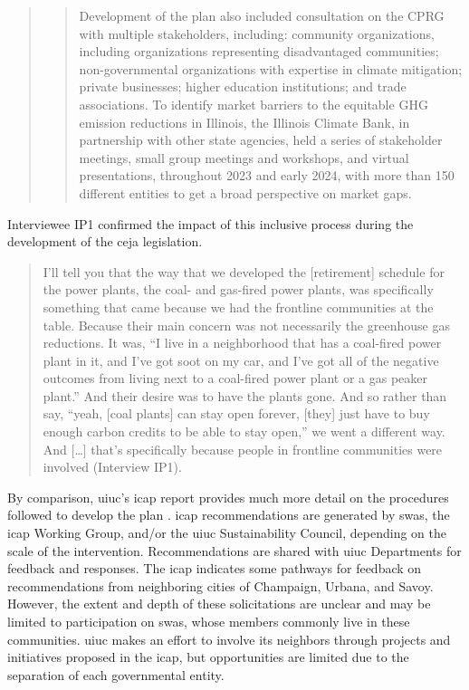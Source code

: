 \begin{quote}
    \blockcquote[10]{kibbey_state_2024}{Development of the plan also included
    consultation on the CPRG with multiple stakeholders, including: community
    organizations, including organizations representing disadvantaged
    communities; non-governmental organizations with expertise in climate
    mitigation; private businesses; higher education institutions; and trade
    associations. To identify market barriers to the equitable GHG emission
    reductions in Illinois, the Illinois Climate Bank, in partnership with other
    state agencies, held a series of stakeholder meetings, small group meetings
    and workshops, and virtual presentations, throughout 2023 and early 2024,
    with more than 150 different entities to get a broad perspective on market
    gaps.}
\end{quote}

Interviewee IP1 confirmed the impact of this inclusive process during the
development of the \ac{ceja} legislation.
\begin{quote}
     I'll tell you that the way that we developed the [retirement] schedule for
     the power plants, the coal- and gas-fired power plants, was specifically
     something that came because we had the frontline communities at the table.
     Because their main concern was not necessarily the greenhouse gas
     reductions. It was, ``I live in a neighborhood that has a coal-fired power
     plant in it, and I've got soot on my car, and I've got all of the negative
     outcomes from living next to a coal-fired power plant or a gas peaker
     plant.'' And their desire was to have the plants gone. And so rather than
     say, ``yeah, [coal plants] can stay open forever, [they] just have to buy
     enough carbon credits to be able to stay open,'' we went a different way.
     And [\dots] that's specifically because people in frontline communities
     were involved (Interview IP1).
\end{quote}

By comparison, \ac{uiuc}'s \acf{icap} report provides much more detail on the
procedures followed to develop the plan
\cite{institute_for_sustainability_energy_and_environment_illinois_2020}.
\ac{icap} recommendations are generated by \acp{swa}, the \ac{icap} Working
Group, and/or the \ac{uiuc} Sustainability Council, depending on the scale of
the intervention. Recommendations are shared with \ac{uiuc} Departments for
feedback and responses. The \ac{icap} indicates some pathways for feedback on
recommendations from neighboring cities of Champaign, Urbana, and Savoy.
However, the extent and depth of these solicitations are unclear and may be
limited to participation on \acp{swa}, whose members commonly live in these
communities. \ac{uiuc} makes an effort to involve its neighbors through projects
and initiatives proposed in the \ac{icap}, but opportunities are limited due to
the separation of each governmental entity. 

